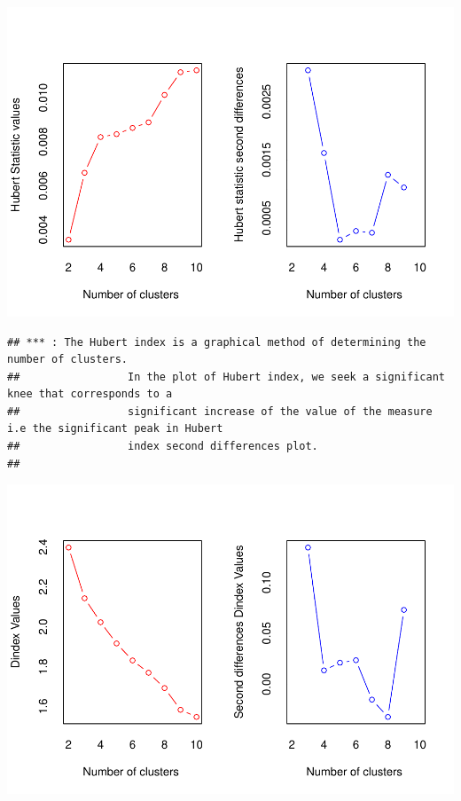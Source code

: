 \documentclass[
]{article}
\begin{document}
\includegraphics{clustering_files/figure-latex/unnamed-chunk-61-1.pdf}

\begin{verbatim}
## *** : The Hubert index is a graphical method of determining the number of clusters.
##                 In the plot of Hubert index, we seek a significant knee that corresponds to a 
##                 significant increase of the value of the measure i.e the significant peak in Hubert
##                 index second differences plot. 
## 
\end{verbatim}

\includegraphics{clustering_files/figure-latex/unnamed-chunk-61-2.pdf}
\end{document}
